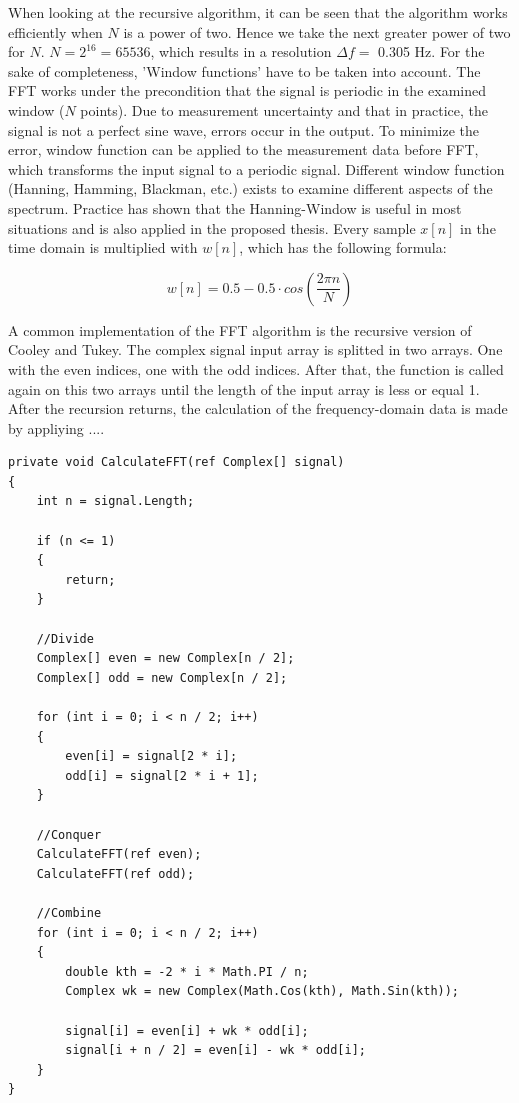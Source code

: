 When looking at the recursive algorithm, it can be seen that the algorithm works efficiently when $N$ is a power of two. Hence we take the next greater power of two for $N$. $N = 2^{16} = 65536$, which results in a resolution $\Delta f = $ 0.305 Hz.
\newline
\newline
For the sake of completeness, 'Window functions' have to be taken into account. The FFT works under the precondition that the signal is periodic in the examined window ($N$ points). Due to measurement uncertainty and that in practice, the signal is not a perfect sine wave, errors occur in the output. To minimize the error, window function can be applied to the measurement data before FFT, which transforms the input signal to a periodic signal. Different window function (Hanning, Hamming, Blackman, etc.) exists to examine different aspects of the spectrum. Practice has shown that the Hanning-Window is useful in most situations and is also applied in the proposed thesis. Every sample $x[n]$ in the time domain is multiplied with $w[n]$, which has the following formula\cite{signalverarbeitung}:

\[w[n] = 0.5 - 0.5 \cdot cos(\frac{2 \pi n}{N})\]

A common implementation of the FFT algorithm is the recursive version of Cooley and Tukey. The complex signal input array is splitted in two arrays. One with the even indices, one with the odd indices. After that, the function is called again on this two arrays until the length of the input array is less or equal 1. After the recursion returns, the calculation of the frequency-domain data is made by appliying .... 

\begin{lstlisting}[frame=single]
private void CalculateFFT(ref Complex[] signal)
{
	int n = signal.Length;

	if (n <= 1)
	{
		return;
	}

	//Divide
	Complex[] even = new Complex[n / 2];
	Complex[] odd = new Complex[n / 2];

	for (int i = 0; i < n / 2; i++)
	{
		even[i] = signal[2 * i];
		odd[i] = signal[2 * i + 1];
	}

	//Conquer
	CalculateFFT(ref even);
	CalculateFFT(ref odd);

	//Combine
	for (int i = 0; i < n / 2; i++)
	{
		double kth = -2 * i * Math.PI / n;
		Complex wk = new Complex(Math.Cos(kth), Math.Sin(kth));

		signal[i] = even[i] + wk * odd[i];
		signal[i + n / 2] = even[i] - wk * odd[i];
	}
}
\end{lstlisting}

